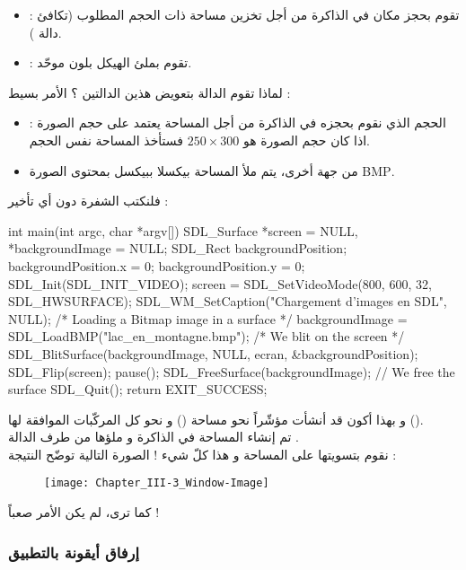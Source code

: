 \begin{itemize}
	\item {} :
	تقوم بحجز مكان في الذاكرة من أجل تخزين مساحة ذات الحجم المطلوب (تكافئ دالة 
	).
	\item {} :
	تقوم بملئ الهيكل بلون موحّد.
\end{itemize}
لماذا تقوم الدالة بتعويض هذين الدالتين ؟ الأمر بسيط :
\begin{itemize}
	\item الحجم الذي نقوم بحجزه في الذاكرة  من أجل المساحة يعتمد على حجم الصورة : اذا كان حجم الصورة هو 
	$250 \times 300$
	فستأخذ المساحة نفس الحجم.
	\item من جهة أخرى، يتم ملأ المساحة بيكسلا ببيكسل بمحتوى الصورة 
	\textenglish{BMP}.
\end{itemize}

فلنكتب الشفرة دون أي تأخير :

\begin{Csource}
int main(int argc, char *argv[])
{
	SDL_Surface *screen = NULL, *backgroundImage = NULL;
	SDL_Rect backgroundPosition;
	backgroundPosition.x = 0;
	backgroundPosition.y = 0;
	SDL_Init(SDL_INIT_VIDEO);
	screen = SDL_SetVideoMode(800, 600, 32, SDL_HWSURFACE);
	SDL_WM_SetCaption("Chargement d'images en SDL", NULL);
	/* Loading a Bitmap image in a surface */	
	backgroundImage = SDL_LoadBMP("lac_en_montagne.bmp");
	/* We blit on the screen */
	SDL_BlitSurface(backgroundImage, NULL, ecran, &backgroundPosition);
	SDL_Flip(screen);
	pause();
	SDL_FreeSurface(backgroundImage); // We free the surface
	SDL_Quit();
	return EXIT_SUCCESS;
}
\end{Csource}

و بهذا أكون قد أنشأت مؤشّراً نحو مساحة
()
و نحو كل المركّبات الموافقة لها
().\\
تم إنشاء المساحة في الذاكرة و ملؤها من طرف الدالة 
.\\
نقوم بتسويتها على المساحة 
و هذا كلّ شيء ! الصورة التالية توضّح النتيجة :

\begin{figure}[H]
	\centering
	\texttt{[image: Chapter\_III-3\_Window-Image]}
\end{figure}

كما ترى، لم يكن الأمر صعباً !

\subsubsection{إرفاق أيقونة بالتطبيق}


